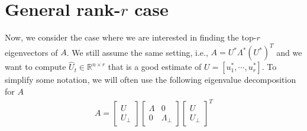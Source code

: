 \documentclass[10pt]{article}
\newcommand{\R}{\mathbb{R}}
\newcommand{\nsrmax}{\text{NSR}}
\newcommand{\ind}{\mathrm{ind}}
\begin{document}


\section{General rank-$r$ case}
Now, we consider the case where we are interested in finding the top-$r$ eigenvectors of $A$. We still assume the same setting, i.e., $A = U^* \Lambda^* (U^*)^T$ and we want to compute $\hat{U}_t \in \R^{n \times r}$ that is a good estimate of $U = [u_1^*, \cdots, u_r^*]$. To simplify some notation, we will often use the following eigenvalue decomposition for $A$
\begin{align*}
A = 
\begin{bmatrix}
U \\ U_{\perp}
\end{bmatrix}
\begin{bmatrix}
\Lambda & 0  \\
0 & \Lambda_{\perp}
\end{bmatrix}
\begin{bmatrix}
U \\ U_{\perp}
\end{bmatrix}^T
\end{align*}
 

\newcommand{\ucos}{\bm{\alpha}}
\newcommand{\usin}{\bm{\alpha}_{\perp}}

\newcommand{\wcos}{\bm{\beta}}
\newcommand{\wsin}{{\bm{\beta}_{\perp}}}
\end{document}

